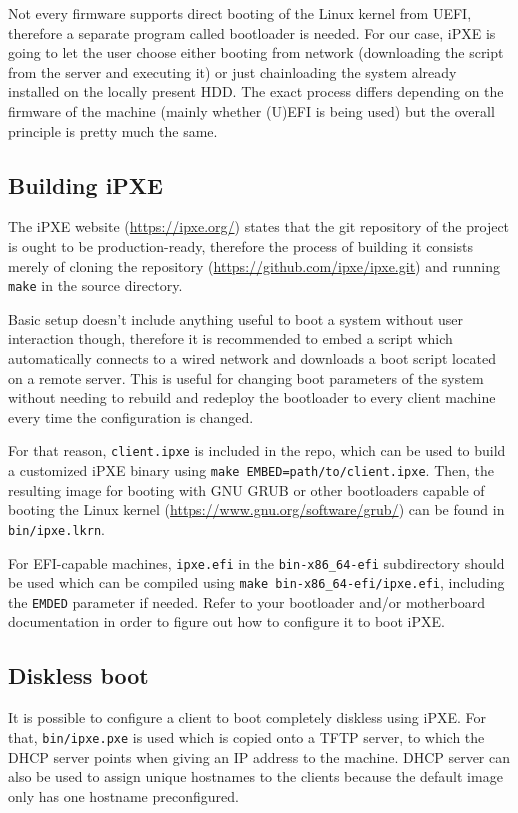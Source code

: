 \documentclass{article}
\begin{document}
Not every firmware supports direct booting of the Linux kernel from UEFI, therefore a separate program called bootloader is needed. For our case, iPXE is going to let the user choose either booting from network (downloading the script from the server and executing it) or just chainloading the system already installed on the locally present HDD. The exact process differs depending on the firmware of the machine (mainly whether (U)EFI is being used) but the overall principle is pretty much the same.

\subsection{Building iPXE}

The iPXE website (\url{https://ipxe.org/}) states that the git repository of the project is ought to be production-ready,
therefore the process of building it consists merely of cloning the repository (\url{https://github.com/ipxe/ipxe.git}) and running \verb|make| in the source directory.

Basic setup doesn't include anything useful to boot a system without user interaction though, therefore it is recommended to embed a script which automatically connects to a wired network and downloads a boot script located on a remote server.
This is useful for changing boot parameters of the system without needing to rebuild and redeploy the bootloader to every client machine every time the configuration is changed.

For that reason, \verb|client.ipxe| is included in the repo, which can be used to build a customized iPXE binary using \verb|make EMBED=path/to/client.ipxe|.
Then, the resulting image for booting with GNU GRUB or other bootloaders capable of booting the Linux kernel (\url{https://www.gnu.org/software/grub/}) can be found in \verb|bin/ipxe.lkrn|.

For EFI-capable machines, \verb|ipxe.efi| in the \verb|bin-x86_64-efi| subdirectory should be used which can be compiled using \verb|make bin-x86_64-efi/ipxe.efi|, including the \verb|EMDED| parameter if needed. Refer to your bootloader and/or motherboard documentation in order to figure out how to configure it to boot iPXE.

\subsection{Diskless boot}

It is possible to configure a client to boot completely diskless using iPXE. For that, \verb|bin/ipxe.pxe| is used which is copied onto a TFTP server, to which the DHCP server points when giving an IP address to the machine. DHCP server can also be used to assign unique hostnames to the clients because the default image only has one hostname preconfigured.
\end{document}

